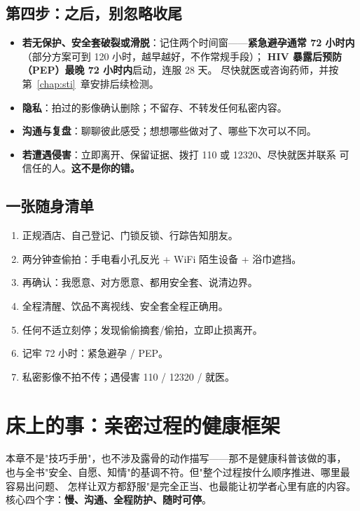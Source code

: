 \section{第四步：之后，别忽略收尾}

\begin{itemize}[leftmargin=2em]
  \item \textbf{若无保护、安全套破裂或滑脱}：记住两个时间窗——\textbf{紧急避孕通常 72 小时内}
        （部分方案可到 120 小时，越早越好，不作常规手段）；
        \textbf{HIV 暴露后预防（PEP）最晚 72 小时内}启动，连服 28 天。
        尽快就医或咨询药师，并按第~\ref{chap:sti}~章安排后续检测。
  \item \textbf{隐私}：拍过的影像确认删除；不留存、不转发任何私密内容。
  \item \textbf{沟通与复盘}：聊聊彼此感受；想想哪些做对了、哪些下次可以不同。
  \item \textbf{若遭遇侵害}：立即离开、保留证据、拨打 110 或 12320、尽快就医并联系
        可信任的人。\textbf{这不是你的错。}
\end{itemize}

\section{一张随身清单}

\begin{enumerate}[leftmargin=2em,itemsep=0.3em]
  \item 正规酒店、自己登记、门锁反锁、行踪告知朋友。
  \item 两分钟查偷拍：手电看小孔反光 + WiFi 陌生设备 + 浴巾遮挡。
  \item 再确认：我愿意、对方愿意、都用安全套、说清边界。
  \item 全程清醒、饮品不离视线、安全套全程正确用。
  \item 任何不适立刻停；发现偷偷摘套/偷拍，立即止损离开。
  \item 记牢 72 小时：紧急避孕 / PEP。
  \item 私密影像不拍不传；遇侵害 110 / 12320 / 就医。
\end{enumerate}

\chapter{床上的事：亲密过程的健康框架}
\label{chap:intimacy}

本章不是"技巧手册"，也不涉及露骨的动作描写——那不是健康科普该做的事，
也与全书"安全、自愿、知情"的基调不符。但"整个过程按什么顺序推进、哪里最容易出问题、
怎样让双方都舒服"是完全正当、也最能让初学者心里有底的内容。
核心四个字：\textbf{慢、沟通、全程防护、随时可停}。

